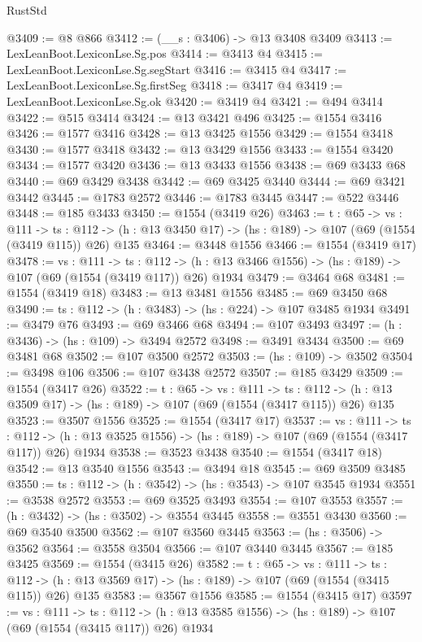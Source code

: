 \begin{lexlean}{RustStd}
\begin{coremodule}
@3409 := @8 @866
@3412 := (__s : @3406) -> @13 @3408 @3409
@3413 := LexLeanBoot.LexiconLse.Sg.pos
@3414 := @3413 @4
@3415 := LexLeanBoot.LexiconLse.Sg.segStart
@3416 := @3415 @4
@3417 := LexLeanBoot.LexiconLse.Sg.firstSeg
@3418 := @3417 @4
@3419 := LexLeanBoot.LexiconLse.Sg.ok
@3420 := @3419 @4
@3421 := @494 @3414
@3422 := @515 @3414
@3424 := @13 @3421 @496
@3425 := @1554 @3416
@3426 := @1577 @3416
@3428 := @13 @3425 @1556
@3429 := @1554 @3418
@3430 := @1577 @3418
@3432 := @13 @3429 @1556
@3433 := @1554 @3420
@3434 := @1577 @3420
@3436 := @13 @3433 @1556
@3438 := @69 @3433 @68
@3440 := @69 @3429 @3438
@3442 := @69 @3425 @3440
@3444 := @69 @3421 @3442
@3445 := @1783 @2572
@3446 := @1783 @3445
@3447 := @522 @3446
@3448 := @185 @3433
@3450 := @1554 (@3419 @26)
@3463 := {t : @65} ->
  {vs : @111} ->
  {ts : @112} -> (h : @13 @3450 @17) -> (hs : @189) -> @107 (@69 (@1554 (@3419 @115)) @26) @135
@3464 := @3448 @1556
@3466 := @1554 (@3419 @17)
@3478 := {vs : @111} ->
  {ts : @112} -> (h : @13 @3466 @1556) -> (hs : @189) -> @107 (@69 (@1554 (@3419 @117)) @26) @1934
@3479 := @3464 @68
@3481 := @1554 (@3419 @18)
@3483 := @13 @3481 @1556
@3485 := @69 @3450 @68
@3490 := {ts : @112} -> (h : @3483) -> (hs : @224) -> @107 @3485 @1934
@3491 := @3479 @76
@3493 := @69 @3466 @68
@3494 := @107 @3493
@3497 := (h : @3436) -> (hs : @109) -> @3494 @2572
@3498 := @3491 @3434
@3500 := @69 @3481 @68
@3502 := @107 @3500 @2572
@3503 := (hs : @109) -> @3502
@3504 := @3498 @106
@3506 := @107 @3438 @2572
@3507 := @185 @3429
@3509 := @1554 (@3417 @26)
@3522 := {t : @65} ->
  {vs : @111} ->
  {ts : @112} -> (h : @13 @3509 @17) -> (hs : @189) -> @107 (@69 (@1554 (@3417 @115)) @26) @135
@3523 := @3507 @1556
@3525 := @1554 (@3417 @17)
@3537 := {vs : @111} ->
  {ts : @112} -> (h : @13 @3525 @1556) -> (hs : @189) -> @107 (@69 (@1554 (@3417 @117)) @26) @1934
@3538 := @3523 @3438
@3540 := @1554 (@3417 @18)
@3542 := @13 @3540 @1556
@3543 := @3494 @18
@3545 := @69 @3509 @3485
@3550 := {ts : @112} -> (h : @3542) -> (hs : @3543) -> @107 @3545 @1934
@3551 := @3538 @2572
@3553 := @69 @3525 @3493
@3554 := @107 @3553
@3557 := (h : @3432) -> (hs : @3502) -> @3554 @3445
@3558 := @3551 @3430
@3560 := @69 @3540 @3500
@3562 := @107 @3560 @3445
@3563 := (hs : @3506) -> @3562
@3564 := @3558 @3504
@3566 := @107 @3440 @3445
@3567 := @185 @3425
@3569 := @1554 (@3415 @26)
@3582 := {t : @65} ->
  {vs : @111} ->
  {ts : @112} -> (h : @13 @3569 @17) -> (hs : @189) -> @107 (@69 (@1554 (@3415 @115)) @26) @135
@3583 := @3567 @1556
@3585 := @1554 (@3415 @17)
@3597 := {vs : @111} ->
  {ts : @112} -> (h : @13 @3585 @1556) -> (hs : @189) -> @107 (@69 (@1554 (@3415 @117)) @26) @1934

\end{coremodule}
\end{lexlean}
